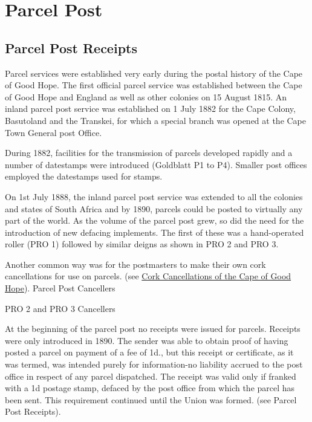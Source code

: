 \chapter{Parcel Post
} 	 
\section{Parcel Post Receipts
} 



Parcel services were established very early during the 
postal history of the Cape of Good Hope. The first official 
parcel service was established between the Cape of Good Hope 
and England as well as other colonies on 15 August 1815. 
An inland parcel post service was established on 1 July 1882 
for the Cape Colony, Basutoland and the Transkei, for which 
a special branch was opened at the Cape Town General post Office.



During 1882, facilities for the transmission of parcels developed 
rapidly and a number of datestamps were introduced (Goldblatt P1 to P4). 
Smaller post offices employed the datestamps used for stamps.


On 1st July 1888, the inland parcel post service was extended to all the colonies and states of South Africa and by 1890, parcels could be posted to virtually any part of the world.  As the volume of the parcel post grew, so did the need for the introduction of new defacing implements. The first of these was a hand-operated roller (PRO 1) followed by similar deigns as shown in PRO 2 and PRO 3.


Another common way was for the postmasters to make their own cork 
cancellations for use on parcels. (see  
\href{Parcel_Post_Cork_Cancellations}{Cork Cancellations of the Cape of Good Hope}).
Parcel Post Cancellers

PRO 2 and PRO 3 Cancellers

At the beginning of the parcel post no receipts were 
issued for parcels. Receipts were only introduced in 1890. The 
sender was able to obtain proof of having posted a parcel on 
payment of a fee of 1d., but this receipt or certificate, as it 
was termed, was intended purely for information-no liability 
accrued to the post office in respect of any parcel dispatched. 
The receipt was valid only if franked with a 1d postage stamp, 
defaced by the post office from which the parcel has been sent. 
This requirement continued until the Union was formed. 
(see Parcel Post Receipts).



 

 

 

 

 

       